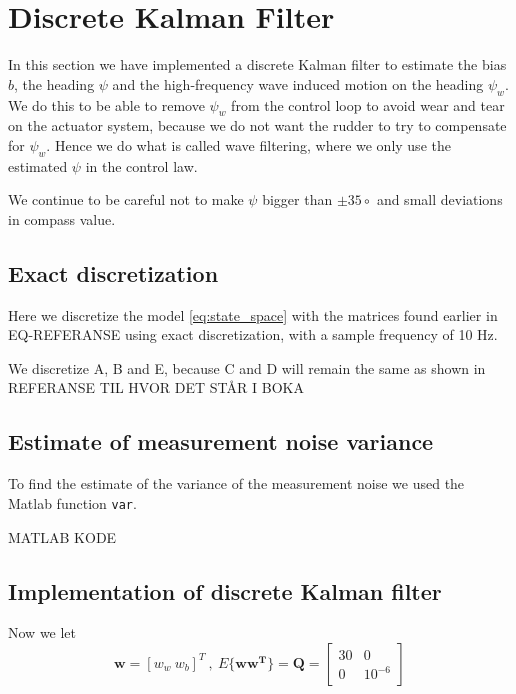 
\section{Discrete Kalman Filter} \label{sec:part5}
In this section we have implemented a discrete Kalman filter to estimate the bias $b$, the heading $\psi$ and the high-frequency wave induced  motion on the heading $\psi_w$. We do this to be able to remove $\psi_w$ from the control loop to avoid wear and tear on the actuator system, because we do not want the rudder to try to compensate for $\psi_w$. Hence we do what is called wave filtering, where we only use the estimated $\psi$ in the control law. 

We continue to be careful not to make $\psi$ bigger than $\pm 35 \circ$ and small deviations in compass value. 

\subsection{Exact discretization}
Here we discretize the model \ref{eq:state_space} with the matrices found earlier in EQ-REFERANSE using exact discretization, with a sample frequency of 10 Hz.  

We discretize A, B and E, because C and D will remain the same as shown in REFERANSE TIL HVOR DET STÅR I BOKA

\subsection{Estimate of measurement noise variance}
To find the estimate of the variance of the measurement noise we used the Matlab function \texttt{var}.
\newline

\label{eq:noise_vaiance} %

MATLAB KODE

\subsection{Implementation of discrete Kalman filter}
Now we let 
\begin{equation}
    \boldsymbol{w} = [w_w \ w_b]^T \ , \ E\{\boldsymbol{w w^T}\} = \boldsymbol{Q} = \begin{bmatrix}
        30 & 0 \\
        0 & 10^{-6} 
    \end{bmatrix}
\end{equation}

